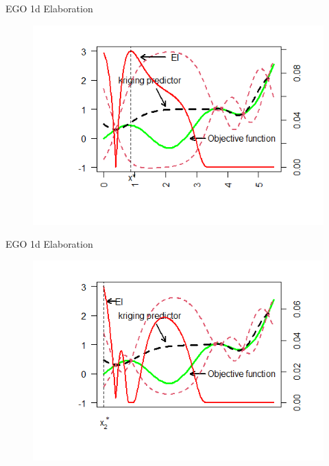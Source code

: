 \documentclass{beamer}
\begin{document}
\begin{frame}{EGO 1d Elaboration}
\begin{figure}
    \centering
    \includegraphics[scale=.7]{images/ego1d/fn5.png}
    \label{fig:f5}
\end{figure}
\end{frame}


\begin{frame}{EGO 1d Elaboration}
\begin{figure}
    \centering
    \includegraphics[scale=.7]{images/ego1d/fn6.png}
    \label{fig:f6}
\end{figure}
\end{frame}
\end{document}
